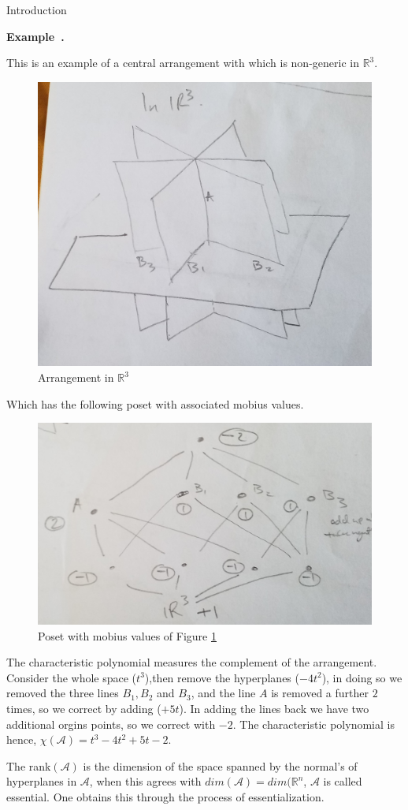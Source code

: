 \documentclass[a4paper,12pt]{article}
\newcounter{example}[]
\newenvironment{example}[1][]{\refstepcounter{example}\par\medskip
   \noindent \textbf{Example~\theexample. #1} \rmfamily}{\medskip}
\theoremstyle{definition}
\theoremstyle{indented}
\begin{document}
\begin{section}{Introduction}
\begin{example}

This is an example of a central arrangement with which is non-generic in $\mathbb{R}^3$.

\begin{figure}[H]
    \centering
    \includegraphics[width=.5\textwidth]{29072020 pics/arrg.jpg}
    \caption{Arrangement in $\mathbb{R}^3$}
    \label{Arranmgnet in R^3}
\end{figure}

Which has the following poset with associated mobius values. 

\begin{figure}[H]
    \centering
    \includegraphics[width=.5\textwidth]{29072020 pics/posetarrg.jpg}
    \caption{Poset with mobius values of Figure \ref{Arranmgnet in R^3}} 
    \label{fig:my_label}
\end{figure}



The characteristic polynomial measures the complement of the arrangement. Consider the whole space ($t^3$),then remove the hyperplanes ($-4t^2$), in doing so we removed the three lines $B_1,B_2$ and $B_3$, and the line $A$ is removed a further $2$ times, so we correct by adding ($+5t$). In adding the lines back we have two additional orgins points, so we correct with $-2$. The characteristic polynomial is hence, $\chi(\mathcal{A})=t^3-4t^2+5t-2$.
\end{example}




The rank$(\mathcal{A})$ is the dimension of the space spanned by the normal's of hyperplanes in $\mathcal{A}$, when this agrees with $dim(\mathcal{A})=dim(\mathbb{R}^n$, $\mathcal{A}$ is called essential. One obtains this through the process of essentialization.  


\end{section}
\end{document}
